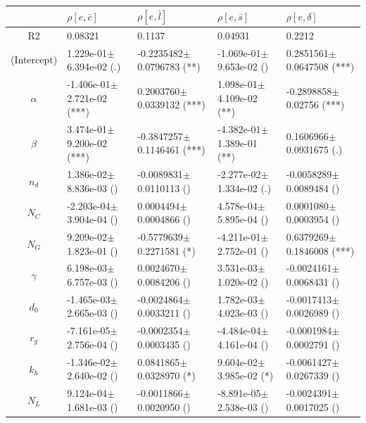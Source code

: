\begin{center}
\begin{tabular}{|c|p{3.7cm}|p{3.7cm}|p{3.7cm}|p{3.7cm}|}
 \hline
&$\rho[e,\bar{c}]$&$\rho[e,\bar{l}]$&$\rho[e,\bar{s}]$&$\rho[e,\delta]$\\\hline
R2&0.08321&0.1137&0.04931&0.2212\\\hline
(Intercept)&1.229e-01$\pm$6.394e-02 (.)&-0.2235482$\pm$0.0796783 (**)&-1.069e-01$\pm$9.653e-02 ()&0.2851561$\pm$0.0647508 (***)\\
$\alpha$&-1.406e-01$\pm$2.721e-02 (***)&0.2003760$\pm$0.0339132 (***)&1.098e-01$\pm$4.109e-02 (**)&-0.2898858$\pm$0.02756 (***)\\
$\beta$&3.474e-01$\pm$9.200e-02 (***)&-0.3847257$\pm$0.1146461 (***)&-4.382e-01$\pm$1.389e-01 (**)&0.1606966$\pm$0.0931675 (.)\\
$n_d$&1.386e-02$\pm$8.836e-03 ()&-0.0089831$\pm$0.0110113 ()&-2.277e-02$\pm$1.334e-02 (.)&-0.0058289$\pm$0.0089484 ()\\
$N_C$&-2.203e-04$\pm$3.904e-04 ()&0.0004494$\pm$0.0004866 ()&4.578e-04$\pm$5.895e-04 ()&0.0001080$\pm$0.0003954 ()\\
$N_G$&9.209e-02$\pm$1.823e-01 ()&-0.5779639$\pm$0.2271581 (*)&-4.211e-01$\pm$2.752e-01 ()&0.6379269$\pm$0.1846008 (***)\\
$\gamma$&6.198e-03$\pm$6.757e-03 ()&0.0024670$\pm$0.0084206 ()&3.531e-03$\pm$1.020e-02 ()&-0.0024161$\pm$0.0068431 ()\\
$d_0$&-1.465e-03$\pm$2.665e-03 ()&-0.0024864$\pm$0.0033211 ()&1.782e-03$\pm$4.023e-03 ()&-0.0017413$\pm$0.0026989 ()\\
$r_g$&-7.161e-05$\pm$2.756e-04 ()&-0.0002354$\pm$0.0003435 ()&-4.484e-04$\pm$4.161e-04 ()&-0.0001984$\pm$0.0002791 ()\\
$k_h$&-1.346e-02$\pm$2.640e-02 ()&0.0841865$\pm$0.0328970 (*)&9.604e-02$\pm$3.985e-02 (*)&-0.0061427$\pm$0.0267339 ()\\
$N_L$&9.124e-04$\pm$1.681e-03 ()&-0.0011866$\pm$0.0020950 ()&-8.891e-05$\pm$2.538e-03 ()&-0.0024391$\pm$0.0017025 ()\\
\hline
\end{tabular}

\end{center}



